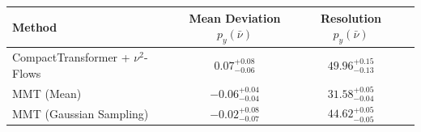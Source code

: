     \begin{tabular}{lccc}
        \toprule
        Method & Mean Deviation $p_{y}(\bar{\nu})$ & Resolution $p_{y}(\bar{\nu})$ \\
        \midrule
        CompactTransformer + $\nu^2$-Flows & $0.07^{+0.08}_{-0.06}$ & $49.96^{+0.15}_{-0.13}$ \\
        MMT (Mean) & $-0.06^{+0.04}_{-0.04}$ & $31.58^{+0.05}_{-0.04}$ \\
        MMT (Gaussian Sampling) & $-0.02^{+0.08}_{-0.07}$ & $44.62^{+0.05}_{-0.05}$ \\
        \bottomrule
    \end{tabular}